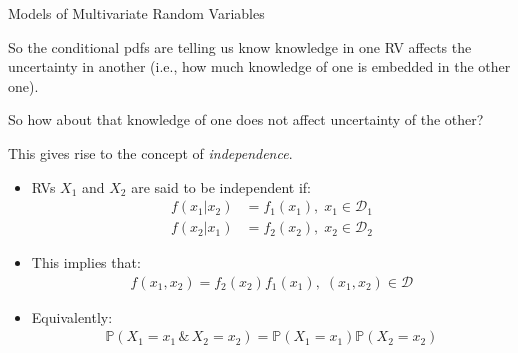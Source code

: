 \documentclass[9pt]{beamer}
\begin{document}
%
\begin{frame}{Models of Multivariate Random Variables}

So the conditional pdfs are telling us know knowledge in one RV affects the uncertainty in another (i.e., how much knowledge of one is embedded in the other one). 
\begin{block}{}
So how about that knowledge of one does not affect uncertainty of the other? 
\end{block}
This gives rise to the concept of {\em independence}.
\begin{itemize}
\item RVs $X_1$ and $X_2$ are said to be independent if:
\begin{align*}
f(x_1|x_2)&=f_1(x_1),\; x_1\in \mathcal{D}_1\\
f(x_2|x_1)&=f_2(x_2),\; x_2\in \mathcal{D}_2
\end{align*}
\item This implies that:
 \begin{align*}
{f(x_1,x_2)}={f_2(x_2)}f_1(x_1),\; (x_1,x_2)\in \mathcal{D}
\end{align*}
\item Equivalently:
 \begin{align*}
\mathbb{P}(X_1=x_1\,\&\,X_2=x_2)=\mathbb{P}(X_1=x_1)\mathbb{P}(X_2=x_2)
\end{align*}

\end{itemize}

\end{frame}
\end{document}
